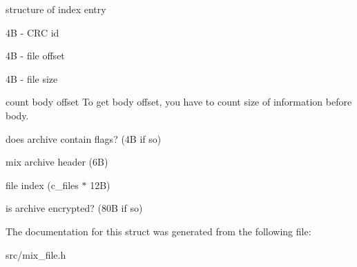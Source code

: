 \begin{DoxyParagraph}{structure of index entry}

\begin{DoxyItemize}
\item 4B -\/ CRC id
\item 4B -\/ file offset
\item 4B -\/ file size
\end{DoxyItemize}
\end{DoxyParagraph}
\begin{DoxyParagraph}{count body offset}
To get body offset, you have to count size of information before body.
\begin{DoxyItemize}
\item does archive contain flags? (4B if so)
\item mix archive header (6B)
\item file index (c\_\-files $\ast$ 12B)
\item is archive encrypted? (80B if so) 
\end{DoxyItemize}
\end{DoxyParagraph}


The documentation for this struct was generated from the following file:\begin{DoxyCompactItemize}
\item 
src/mix\_\-file.h\end{DoxyCompactItemize}

